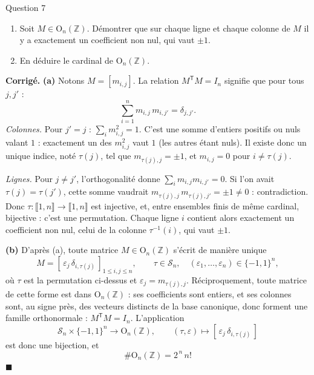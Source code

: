 \documentclass[11pt,a4paper]{article}
\newenvironment{corrige}
  {\par\medskip\noindent
   \begin{tcolorbox}[blanker, breakable,
     borderline west={2.5pt}{0pt}{vertP},
     left=10pt, top=2pt, bottom=2pt]
   {\color{vertP}\bfseries Corrigé.}\hspace{0.5em}\ignorespaces}
  {\hfill$\blacksquare$\end{tcolorbox}\medskip}
\newcommand{\Z}{\mathbb{Z}}
\newcommand{\On}[1][n]{\mathrm{O}_{#1}}
\newcommand{\Perm}[1][n]{\mathcal{S}_{#1}} %
\newcommand{\ii}[2]{\llbracket #1,#2\rrbracket}
\newcommand{\T}{\mathsf{T}}               %
\begin{document}
\begin{enonce}{Question 7}
\begin{enumerate}
\item Soit $M\in\On(\Z)$. Démontrer que sur chaque ligne et chaque
colonne de $M$ il y a exactement un coefficient non nul, qui vaut
$\pm 1$.
\item En déduire le cardinal de $\On(\Z)$.
\end{enumerate}
\end{enonce}

\begin{corrige}
\textbf{(a)} Notons $M=[m_{i,j}]$. La relation $M^{\T}M=I_n$ signifie
que pour tous $j,j'$ :
\[
\sum_{i=1}^{n}m_{i,j}\,m_{i,j'}=\delta_{j,j'} .
\]
\emph{Colonnes.} Pour $j'=j$ : $\sum_{i}m_{i,j}^{2}=1$. C'est une
somme d'entiers positifs ou nuls valant $1$ : exactement un des
$m_{i,j}^{2}$ vaut $1$ (les autres étant nuls). Il existe donc un
unique indice, noté $\tau(j)$, tel que $m_{\tau(j),j}=\pm 1$, et
$m_{i,j}=0$ pour $i\neq\tau(j)$.

\emph{Lignes.} Pour $j\neq j'$, l'orthogonalité donne
$\sum_i m_{i,j}m_{i,j'}=0$. Si l'on avait $\tau(j)=\tau(j')$, cette
somme vaudrait $m_{\tau(j),j}\,m_{\tau(j),j'}=\pm 1\neq 0$ :
contradiction. Donc $\tau:\ii{1}{n}\to\ii{1}{n}$ est injective, et,
entre ensembles finis de même cardinal, bijective : c'est une
permutation. Chaque ligne $i$ contient alors exactement un coefficient
non nul, celui de la colonne $\tau^{-1}(i)$, qui vaut $\pm 1$.

\textbf{(b)} D'après (a), toute matrice $M\in\On(\Z)$ s'écrit de
manière unique
\[
M=[\,\varepsilon_j\,\delta_{i,\tau(j)}\,]_{1\le i,j\le n},
\qquad \tau\in\Perm,\quad
(\varepsilon_1,\dots,\varepsilon_n)\in\{-1,1\}^{n},
\]
où $\tau$ est la permutation ci-dessus et $\varepsilon_j=m_{\tau(j),j}$.
Réciproquement, toute matrice de cette forme est dans $\On(\Z)$ : ses
coefficients sont entiers, et ses colonnes sont, au signe près, des
vecteurs distincts de la base canonique, donc forment une famille
orthonormale : $M^{\T}M=I_n$. L'application
\[
\Perm\times\{-1,1\}^{n}\longrightarrow\On(\Z),\qquad
(\tau,\varepsilon)\longmapsto[\,\varepsilon_j\,\delta_{i,\tau(j)}\,]
\]
est donc une bijection, et
\[
\boxed{\ \#\On(\Z)=2^{\,n}\,n!\ }
\]
\end{corrige}
\end{document}
